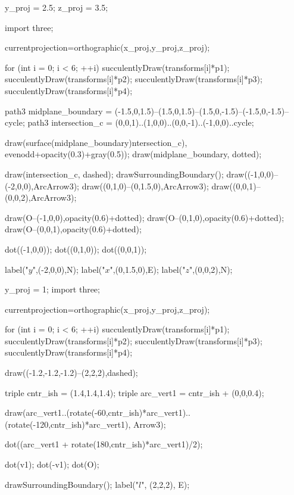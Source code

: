 \documentclass[../key.tex]{subfiles}
\begin{document}
\begin{minipage}{0.4\textwidth}
\begin{asy}[width=0.9\textwidth]
	y_proj = 2.5;
	z_proj = 3.5;

	import three;

	currentprojection=orthographic(x_proj,y_proj,z_proj);

	for (int i = 0; i < 6; ++i) {
		succulentlyDraw(transforms[i]*p1);
		succulentlyDraw(transforms[i]*p2);
		succulentlyDraw(transforms[i]*p3);
		succulentlyDraw(transforms[i]*p4);
	}

	path3 midplane_boundary = (-1.5,0,1.5)--(1.5,0,1.5)--(1.5,0,-1.5)--(-1.5,0,-1.5)--cycle;
	path3 intersection_c = (0,0,1)..(1,0,0)..(0,0,-1)..(-1,0,0)..cycle;

	draw(surface(midplane_boundary^^intersection_c), evenodd+opacity(0.3)+gray(0.5));
	draw(midplane_boundary, dotted);

	draw(intersection_c, dashed);
	drawSurroundingBoundary();
	draw((-1,0,0)--(-2,0,0),ArcArrow3);
	draw((0,1,0)--(0,1.5,0),ArcArrow3);
	draw((0,0,1)--(0,0,2),ArcArrow3);

	draw(O--(-1,0,0),opacity(0.6)+dotted);
	draw(O--(0,1,0),opacity(0.6)+dotted);
	draw(O--(0,0,1),opacity(0.6)+dotted);

	dot((-1,0,0));
	dot((0,1,0));
	dot((0,0,1));

	label("$y$",(-2,0,0),N);
	label("$x$",(0,1.5,0),E);
	label("$z$",(0,0,2),N);
\end{asy}
\label{fig:symmetry_R}
\end{minipage}\hfill
\begin{minipage}{0.4\textwidth}
\begin{asy}[width=0.9\textwidth]
	y_proj = 1;
	import three;

	currentprojection=orthographic(x_proj,y_proj,z_proj);

	for (int i = 0; i < 6; ++i) {
		succulentlyDraw(transforms[i]*p1);
		succulentlyDraw(transforms[i]*p2);
		succulentlyDraw(transforms[i]*p3);
		succulentlyDraw(transforms[i]*p4);
	}

	draw((-1.2,-1.2,-1.2)--(2,2,2),dashed);

  triple cntr_ish = (1.4,1.4,1.4);
	triple arc_vert1 = cntr_ish + (0,0,0.4);

	draw(arc_vert1..(rotate(-60,cntr_ish)*arc_vert1)..(rotate(-120,cntr_ish)*arc_vert1), Arrow3);

	dot((arc_vert1 + rotate(180,cntr_ish)*arc_vert1)/2);

	dot(v1);
	dot(-v1);
	dot(O);

	drawSurroundingBoundary();
	label("$l$", (2,2,2), E);
\end{asy}
\label{fig:symmetry_Q}
\end{minipage}
\end{document}
